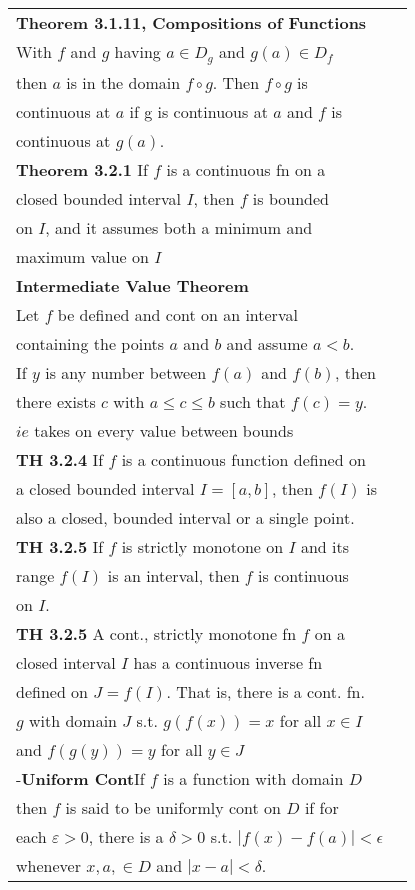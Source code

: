 \documentclass[10 pt,landscape]{article}
\begin{document}
\begin{multicols}{4}
\begin{tabular}{@{}ll@{}}
\end{tabular}


\begin{tabular}{@{}ll@{}}


\textbf{Theorem 3.1.11, Compositions of Functions}\\
With $f$ and $g$ having $a \in D_g$ and $g(a) \in D_f$ \\then $a$ is in the domain $f\circ g$. Then $f\circ g$ is\\ continuous at $a$ if g is continuous at $a$ and $f$ is\\ continuous at $g(a)$.\\
\textbf{Theorem 3.2.1} If $f$ is a continuous fn on a\\ closed bounded interval $I$, then $f$ is bounded\\ on $I$, and it assumes both a minimum and\\ maximum value on $I$\\
\textbf{Intermediate Value Theorem}\\
Let $f$ be defined and cont on an interval\\ containing the points $a$ and $b$ and assume $a<b$.\\ If $y$ is any number between $f(a)$ and $f(b)$, then \\ there exists $c$ with $a\leq c \leq b$ such that \:$f(c)=y$. \\$ie$ takes on every value between bounds\\
\textbf{TH 3.2.4} If $f$ is a continuous function defined on\\ a closed bounded interval $I=[a,b]$, then $f(I)$ is\\ also a closed, bounded interval or a single point.\\
\textbf{TH 3.2.5} If $f$ is strictly monotone on $I$ and its \\ range $f(I)$ is an interval, then $f$ is continuous \\on $I$.\\
\textbf{TH 3.2.5} A cont., strictly monotone fn $f$ on a \\closed interval $I$ has a continuous  inverse fn\\ defined on $J=f(I)$. That is, there is a cont. fn. \\ $g$ with domain $J$ s.t. $g(f(x))=x$ for all $x \in I$\\ and $f(g(y))=y$ for all $y \in J$\\
-\textbf{Uniform Cont}If $f$ is a function with domain $D$\\ then $f$ is said to be uniformly cont on $D$ if for \\each $\varepsilon >0$, there is a $\delta >0$ s.t. $|f(x)-f(a)|< \epsilon$\\ whenever $x,a,\in D$  and $|x-a|<\delta$.\\

\end{tabular}
\end{multicols}
\end{document}
